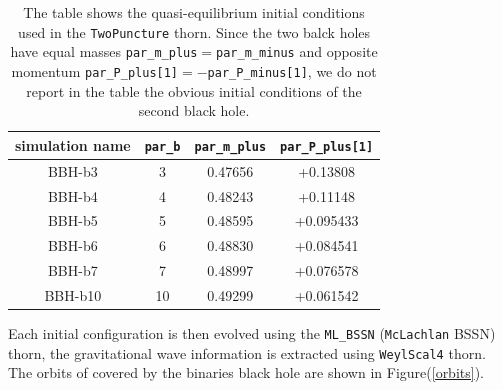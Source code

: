 \begin{table}
\centering
\begin{tabular}{|c|c|c|c|}
\hline 
simulation name & \texttt{par\_b} & \texttt{par\_m\_plus} & \texttt{par\_P\_plus[1]} \\ 
\hline 
BBH-b3 & 3 & 0.47656
 & +0.13808 \\ 
BBH-b4 & 4 & 0.48243 & +0.11148 \\ 
BBH-b5 & 5 & 0.48595 & +0.095433 \\ 
BBH-b6 & 6 & 0.48830 & +0.084541 \\ 
BBH-b7 & 7 &  0.48997 & +0.076578 \\ 
BBH-b10 & 10 & 0.49299 & +0.061542 \\ 
\hline 
\end{tabular} 
\caption{The table shows the quasi-equilibrium initial conditions used in the \texttt{TwoPuncture} thorn. Since the two balck holes have equal masses \texttt{par\_m\_plus}$=$\texttt{par\_m\_minus} and opposite momentum \texttt{par\_P\_plus[1]}$=- $\texttt{par\_P\_minus[1]}, we do not report in the table the obvious initial conditions of the second black hole.}
\label{initial_conditions_bbh}
\end{table}
Each initial configuration is then evolved using the \texttt{ML\_BSSN} (\texttt{McLachlan} BSSN) thorn, the gravitational wave information is extracted using \texttt{WeylScal4} thorn.\\
The orbits of covered by the binaries black hole are shown in Figure(\ref{orbits}).
